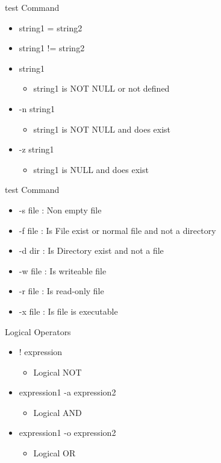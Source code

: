 \documentclass{beamer}
\begin{document}
\begin{frame}{test Command}
\begin{itemize}
\item string1 = string2
\item string1 != string2
\item string1 
\begin{itemize}
\item string1 is NOT NULL or not defined
\end{itemize}
\item -n string1 
\begin{itemize}
\item string1 is NOT NULL and does exist
\end{itemize}
\item -z string1
\begin{itemize}
\item string1 is NULL and does exist
\end{itemize}
\end{itemize}
\end{frame}

\begin{frame}{test Command}
\begin{itemize}
\item -s file : Non empty file
\item -f file : Is File exist or normal file and not a directory
\item -d dir : Is Directory exist and not a file
\item -w file : Is writeable file
\item -r file : Is read-only file
\item -x file : Is file is executable
\end{itemize}
\end{frame}

\begin{frame}{Logical Operators}
\begin{itemize}
\item ! expression
\begin{itemize}
\item Logical NOT
\end{itemize}
\item expression1 -a expression2
\begin{itemize}
\item Logical AND
\end{itemize}
\item expression1 -o expression2
\begin{itemize}
\item Logical OR
\end{itemize}
\end{itemize}
\end{frame}
\end{document}

